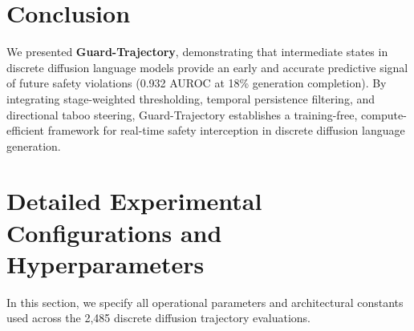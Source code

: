 \documentclass[conference]{IEEEtran}
\begin{document}
\section{Conclusion}
We presented \textbf{Guard-Trajectory}, demonstrating that intermediate states in discrete diffusion language models provide an early and accurate predictive signal of future safety violations (0.932 AUROC at 18\% generation completion). By integrating stage-weighted thresholding, temporal persistence filtering, and directional taboo steering, Guard-Trajectory establishes a training-free, compute-efficient framework for real-time safety interception in discrete diffusion language generation.




\clearpage
\appendices
\section{Detailed Experimental Configurations and Hyperparameters}
\label{app:hyperparams}
In this section, we specify all operational parameters and architectural constants used across the 2,485 discrete diffusion trajectory evaluations.
\end{document}
